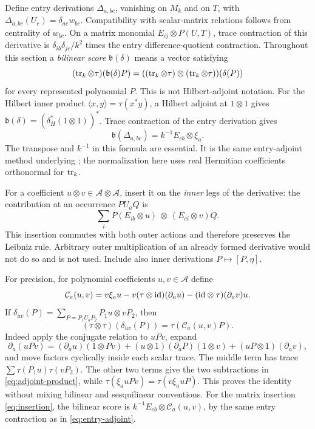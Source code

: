 \documentclass[11pt]{article}
\theoremstyle{definition}\newtheorem{definition}[theorem]{Definition}
\theoremstyle{remark}\newtheorem{remark}[theorem]{Remark}
\begin{document}
Define entry derivations $\Delta_{a,bc}$, vanishing on $M_k$ and on
$T$, with
$\Delta_{a,bc}(U_e)=\delta_{ae}w_{bc}$.
Compatibility with scalar-matrix relations follows from centrality of
$w_{bc}$. On a matrix monomial $E_{ij}\otimes P(U,T)$, trace
contraction of this derivative is
$\delta_{ib}\delta_{jc}/k^2$ times the entry difference-quotient
contraction. Throughout this section a \emph{bilinear score}
$\mathfrak b(\delta)$ means a vector satisfying
\[
 (\operatorname{tr}_k\otimes\tau)(\mathfrak b(\delta)P)
 =((\operatorname{tr}_k\otimes\tau)\otimes(\operatorname{tr}_k\otimes\tau))(\delta(P))
\]
for every represented polynomial $P$. This is not Hilbert-adjoint
notation. For the Hilbert inner product $\langle x,y\rangle=\tau(x^*y)$,
a Hilbert adjoint at $1\otimes1$ gives
$\mathfrak b(\delta)=(\delta_H^*(1\otimes1))^*$.
Trace contraction of the entry derivation gives
\begin{equation}\label{eq:entry-adjoint}
 \mathfrak b(\Delta_{a,bc})=k^{-1}E_{cb}\otimes\xi_a.
\end{equation}
The transpose and $k^{-1}$ in this formula are essential.
It is the same entry-adjoint method underlying
\cite[Proposition 4.1]{NSSfisher}; the normalization here uses real
Hermitian coefficients orthonormal for $\operatorname{tr}_k$.

For a coefficient $u\otimes v\in\mathcal A\otimes\mathcal A$,
insert it on the \emph{inner} legs of the derivative: the contribution
at an occurrence $P U_a Q$ is
\begin{equation}\label{eq:insertion}
 \sum_i P(E_{ib}\otimes u)\ \otimes\ (E_{ci}\otimes v)Q.
\end{equation}
This insertion commutes with both outer actions and therefore preserves
the Leibniz rule. Arbitrary outer multiplication of an already formed
derivative would not do so and is not used. Include also inner
derivations $P\mapsto[P,\eta]$.

For precision, for polynomial coefficients $u,v\in\mathcal A$ define
\begin{equation}\label{eq:adjoint-product}
 \mathcal C_a(u,v)=v\xi_a u
 -v(\tau\otimes\mathrm{id})(\partial_a u)
 -(\mathrm{id}\otimes\tau)(\partial_a v)u.
\end{equation}
If $\delta_{uv}(P)=\sum_{P=P_1U_aP_2}P_1u\otimes vP_2$, then
\begin{equation}\label{eq:bilinear-pairing}
 (\tau\otimes\tau)(\delta_{uv}(P))
 =\tau(\mathcal C_a(u,v)P).
\end{equation}
Indeed apply the conjugate relation to $uPv$, expand
\[
 \partial_a(uPv)=(\partial_a u)(1\otimes Pv)
 +(u\otimes1)(\partial_aP)(1\otimes v)
 +(uP\otimes1)(\partial_a v),
\]
and move factors cyclically inside each scalar trace. The middle term
has trace $\sum\tau(P_1u)\tau(vP_2)$. The other two terms give the two
subtractions in \eqref{eq:adjoint-product}, while
$\tau(\xi_a uPv)=\tau(v\xi_a uP)$. This proves the identity without
mixing bilinear and sesquilinear conventions. For the matrix insertion
\eqref{eq:insertion}, the bilinear score is
$k^{-1}E_{cb}\otimes\mathcal C_a(u,v)$, by the same entry contraction
as in \eqref{eq:entry-adjoint}.
\end{document}
